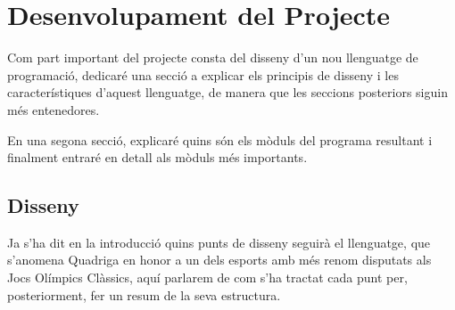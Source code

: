 \chapter{Desenvolupament del Projecte}

Com part important del projecte consta del disseny d'un nou llenguatge de programació, dedicaré una secció a explicar els principis de disseny i les característiques d'aquest llenguatge, de manera que les seccions posteriors siguin més entenedores.

En una segona secció, explicaré quins són els mòduls del programa resultant i finalment entraré en detall als mòduls més importants.

\section{Disseny}

Ja s'ha dit en la introducció quins punts de disseny seguirà el llenguatge, que s'anomena Quadriga en honor a un dels esports amb més renom disputats als Jocs Olímpics Clàssics, aquí parlarem de com s'ha tractat cada punt per, posteriorment, fer un resum de la seva estructura.


